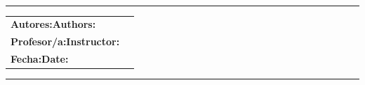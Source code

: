 \newcommand{\maketeampage}{%
  \thispagestyle{empty}

  \vspace*{8mm}

  \noindent
  {\bfseries\Large \titlee\par}

  \vspace{2mm}
  {\normalsize \subject\ \textbullet\ \doctype\ \docid\par}

  \vspace{10mm}
  \noindent\rule{\textwidth}{0.6pt}

  \vspace{10mm}

  \noindent
  \begin{tabularx}{\textwidth}{@{}lX@{}}
    {\bfseries \ifES Autores:\else Authors:\fi} & \authors \\
    {\bfseries \ifES Profesor/a:\else Instructor:\fi} & \teacher \\
    {\bfseries \ifES Fecha:\else Date:\fi} & \placedate \\
  \end{tabularx}

  \vfill

  \noindent\rule{\textwidth}{0.6pt}

  \newpage
}







\hypersetup{pageanchor=false}

\makecover
\maketeampage

\hypersetup{pageanchor=true}
\setcounter{page}{1}
\pagestyle{fancy}


\ifES
  
\else
  
\fi

\newpage


